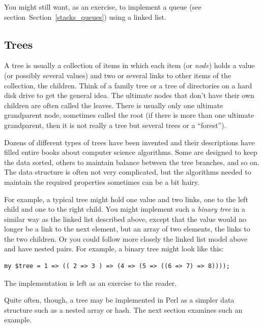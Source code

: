 You might still want, as an exercise, to implement a queue 
(see section~Section~\ref{stacks_queues}) using a linked list. 

\subsection{Trees}
\label{tree}

A tree is usually a collection of items in which each 
item (or \emph{node}) holds a value (or possibly 
several values) and two or several 
links to other items of the collection, the children. Think 
of a family tree or a tree of directories on a hard disk 
drive to get the general idea. The ultimate 
nodes that don't have their own children are often called 
the leaves. There is usually only one ultimate grandparent 
node, sometimes called the root (if there is more than one 
ultimate grandparent, then it is not really a tree but 
several trees or a ``forest'').

Dozens of different types of trees have been invented and 
their descriptions have filled entire books about computer 
science algorithms. Some are designed 
to keep the data sorted, others to maintain balance between 
the tree branches, and so on. The data structure is often 
not very complicated, but the algorithms needed to maintain the 
required properties sometimes can be a bit hairy.

For example, a 
typical tree might hold one value and two links, one to 
the left child and one to the right child. You 
might implement such a \emph{binary tree} in a similar way as the 
linked list described above, except that the value 
would no longer be a link to the next element, but an 
array of two elements, the links to the two children. 
Or you could follow more closely the linked list model 
above and have nested pairs. For example, a binary tree 
might look like this:

\begin{verbatim}
my $tree = 1 => (( 2 => 3 ) => (4 => (5 => ((6 => 7) => 8))));
\end{verbatim}

The implementation is left as an exercise to the reader. 

Quite often, though, a tree may be implemented in Perl 
as a simpler data structure such as a nested array or hash. 
The next section examines such an example.

